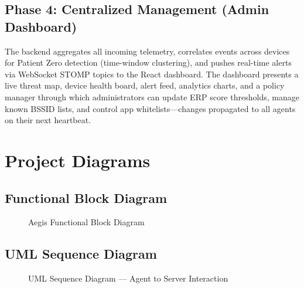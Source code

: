 \documentclass[12pt,a4paper]{report}
\begin{document}
\section{Phase 4: Centralized Management (Admin Dashboard)}

The backend aggregates all incoming telemetry, correlates events across devices for Patient Zero detection (time-window clustering), and pushes real-time alerts via WebSocket STOMP topics to the React dashboard. The dashboard presents a live threat map, device health board, alert feed, analytics charts, and a policy manager through which administrators can update ERP score thresholds, manage known BSSID lists, and control app whitelists—changes propagated to all agents on their next heartbeat.

\chapter{Project Diagrams}

\section{Functional Block Diagram}

\begin{figure}[H]
  \centering
  \caption{Aegis Functional Block Diagram}
  \label{fig:fbd}
\end{figure}

\section{UML Sequence Diagram}

\begin{figure}[H]
  \centering
  \caption{UML Sequence Diagram — Agent to Server Interaction}
  \label{fig:uml}
\end{figure}
\end{document}
